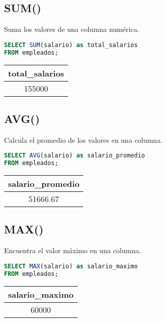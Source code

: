 \documentclass[12pt]{article}
\begin{document}
\subsection{SUM()}
Suma los valores de una columna numérica.

\begin{lstlisting}[language=SQL]
SELECT SUM(salario) as total_salarios
FROM empleados;
\end{lstlisting}

\begin{center}
\begin{tabular}{c}
\toprule
total\_salarios \\
\midrule
155000 \\
\bottomrule
\end{tabular}
\end{center}

\subsection{AVG()}
Calcula el promedio de los valores en una columna.

\begin{lstlisting}[language=SQL]
SELECT AVG(salario) as salario_promedio
FROM empleados;
\end{lstlisting}

\begin{center}
\begin{tabular}{c}
\toprule
salario\_promedio \\
\midrule
51666.67 \\
\bottomrule
\end{tabular}
\end{center}

\subsection{MAX()}
Encuentra el valor máximo en una columna.

\begin{lstlisting}[language=SQL]
SELECT MAX(salario) as salario_maximo
FROM empleados;
\end{lstlisting}

\begin{center}
\begin{tabular}{c}
\toprule
salario\_maximo \\
\midrule
60000 \\
\bottomrule
\end{tabular}
\end{center}
\end{document}
